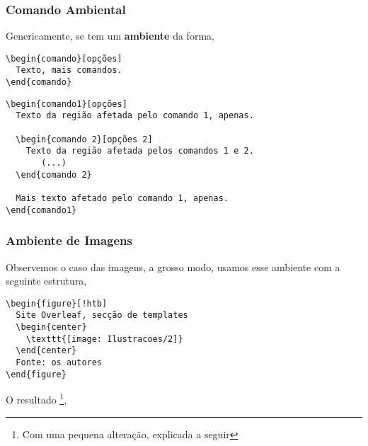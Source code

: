 \documentclass[12pt, brazilian, a5paper]{abntex2} %
\begin{document}
\subsubsection{Comando Ambiental}
\vspace{0.3cm}

\noindent Genericamente, se tem um \textbf{ambiente} da forma,

\begin{center}
\begin{verbatim}
\begin{comando}[opções]
  Texto, mais comandos.
\end{comando}
\end{verbatim}
\end{center}

\begin{center}
\begin{verbatim}
\begin{comando1}[opções]
  Texto da região afetada pelo comando 1, apenas.

  \begin{comando 2}[opções 2]
    Texto da região afetada pelos comandos 1 e 2.
       (...)
  \end{comando 2}

  Mais texto afetado pelo comando 1, apenas.
\end{comando1}
\end{verbatim}
\end{center}

\subsubsection{Ambiente de Imagens}
\vspace{.3cm}
\noident Observemos o caso das imagens, a grosso modo, usamos esse ambiente com
a seguinte estrutura,

\begin{center}
\begin{verbatim}
\begin{figure}[!htb]
  Site Overleaf, secção de templates
  \begin{center}
    \texttt{[image: Ilustracoes/2]}
  \end{center}
  Fonte: os autores
\end{figure}
\end{verbatim}
\end{center}
\noident O resultado \footnote{Com uma pequena alteração, explicada a seguir},
\end{document}

